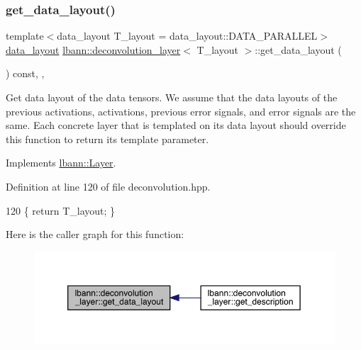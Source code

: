 \subsubsection{\texorpdfstring{get\+\_\+data\+\_\+layout()}{get\_data\_layout()}}
{\footnotesize\ttfamily template$<$data\+\_\+layout T\+\_\+layout = data\+\_\+layout\+::\+D\+A\+T\+A\+\_\+\+P\+A\+R\+A\+L\+L\+EL$>$ \\
\hyperlink{base_8hpp_a786677cbfb3f5677b4d84f3056eb08db}{data\+\_\+layout} \hyperlink{classlbann_1_1deconvolution__layer}{lbann\+::deconvolution\+\_\+layer}$<$ T\+\_\+layout $>$\+::get\+\_\+data\+\_\+layout (\begin{DoxyParamCaption}{ }\end{DoxyParamCaption}) const\hspace{0.3cm}{\ttfamily [inline]}, {\ttfamily [override]}, {\ttfamily [virtual]}}

Get data layout of the data tensors. We assume that the data layouts of the previous activations, activations, previous error signals, and error signals are the same. Each concrete layer that is templated on its data layout should override this function to return its template parameter. 

Implements \hyperlink{classlbann_1_1Layer_a5dfb66e81fc085997402a5e2241316bd}{lbann\+::\+Layer}.



Definition at line 120 of file deconvolution.\+hpp.


\begin{DoxyCode}
120 \{ \textcolor{keywordflow}{return} T\_layout; \}
\end{DoxyCode}
Here is the caller graph for this function\+:\nopagebreak
\begin{figure}[H]
\begin{center}
\leavevmode
\includegraphics[width=350pt]{classlbann_1_1deconvolution__layer_a43249c72b440db8b5a1a7f2735c6a118_icgraph}
\end{center}
\end{figure}
\mbox{\label{classlbann_1_1deconvolution__layer_a07f211e08383fe8e26b6e1b916136b67}} 
